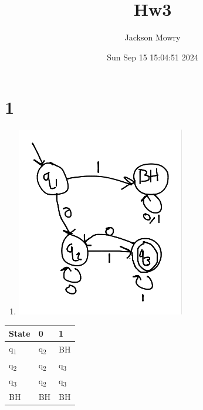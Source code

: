 \documentclass[11pt]{article}
\author{Jackson Mowry}
\date{Sun Sep 15 15:04:51 2024}
\title{Hw3}
\begin{document}
\maketitle
\tableofcontents

\section{1}
\label{sec:org8fb3ea7}
\begin{enumerate}
\item \begin{center}
\includegraphics[width=.9\linewidth]{1-1.png}
\end{center}
\end{enumerate}
\begin{center}
\begin{tabular}{l|l|l}
State & 0 & 1\\
\hline
q\textsubscript{1} & q\textsubscript{2} & BH\\
q\textsubscript{2} & q\textsubscript{2} & q\textsubscript{3}\\
q\textsubscript{3} & q\textsubscript{2} & q\textsubscript{3}\\
BH & BH & BH\\
\end{tabular}
\end{center}
\end{document}
